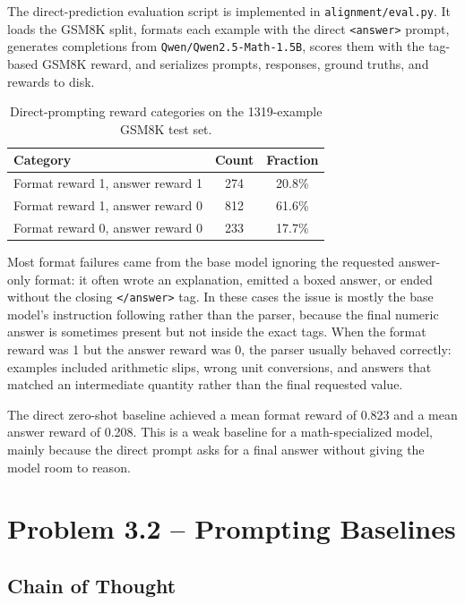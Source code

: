 \documentclass[11pt]{article}
\begin{document}
The direct-prediction evaluation script is implemented in \texttt{alignment/eval.py}. It loads the GSM8K split, formats each example with the direct \texttt{<answer>} prompt, generates completions from \texttt{Qwen/Qwen2.5-Math-1.5B}, scores them with the tag-based GSM8K reward, and serializes prompts, responses, ground truths, and rewards to disk.

\begin{table}[h]
\centering
\begin{tabular}{lcc}
\toprule
Category & Count & Fraction \\
\midrule
Format reward 1, answer reward 1 & 274 & 20.8\% \\
Format reward 1, answer reward 0 & 812 & 61.6\% \\
Format reward 0, answer reward 0 & 233 & 17.7\% \\
\bottomrule
\end{tabular}
\caption{Direct-prompting reward categories on the 1319-example GSM8K test set.}
\end{table}

Most format failures came from the base model ignoring the requested answer-only format: it often wrote an explanation, emitted a boxed answer, or ended without the closing \texttt{</answer>} tag. In these cases the issue is mostly the base model's instruction following rather than the parser, because the final numeric answer is sometimes present but not inside the exact tags. When the format reward was 1 but the answer reward was 0, the parser usually behaved correctly: examples included arithmetic slips, wrong unit conversions, and answers that matched an intermediate quantity rather than the final requested value.

The direct zero-shot baseline achieved a mean format reward of 0.823 and a mean answer reward of 0.208. This is a weak baseline for a math-specialized model, mainly because the direct prompt asks for a final answer without giving the model room to reason.


\section{Problem 3.2 -- Prompting Baselines}

\subsection*{Chain of Thought}
\end{document}

